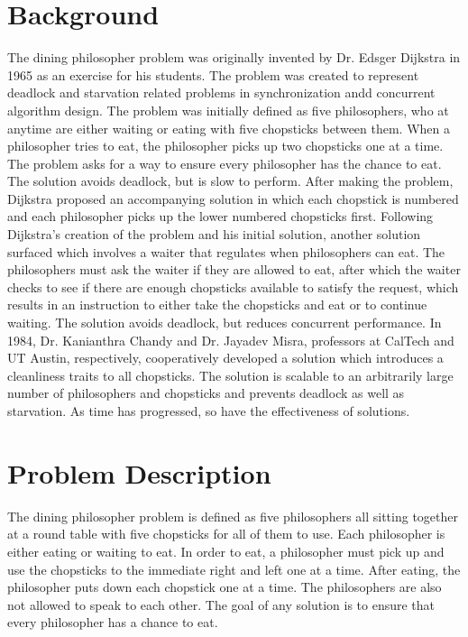 \documentclass{article}
\begin{document}
\section{Background} The dining philosopher problem was originally invented by Dr. Edsger Dijkstra in 1965 as an exercise for his students. The problem was created to represent deadlock and starvation related problems in synchronization andd concurrent algorithm design. The problem was initially defined as five philosophers, who at anytime are either waiting or eating with five chopsticks between them. When a philosopher tries to eat, the philosopher picks up two chopsticks one at a time. The problem asks for a way to ensure every philosopher has the chance to eat. The solution avoids deadlock, but is slow to perform. After making the problem, Dijkstra proposed an accompanying solution in which each chopstick is numbered and each philosopher picks up the lower numbered chopsticks first. Following Dijkstra's creation of the problem and his initial solution, another solution surfaced which involves a waiter that regulates when philosophers can eat. The philosophers must ask the waiter if they are allowed to eat, after which the waiter checks to see if there are enough chopsticks available to satisfy the request, which results in an instruction to either take the chopsticks and eat or to continue waiting. The solution avoids deadlock, but reduces concurrent performance. In 1984, Dr. Kanianthra Chandy and Dr. Jayadev Misra, professors at CalTech and UT Austin, respectively, cooperatively developed a solution which introduces a cleanliness traits to all chopsticks. The solution is scalable to an arbitrarily large number of philosophers and chopsticks and prevents deadlock as well as starvation. As time has progressed, so have the effectiveness of solutions.

\section{Problem Description} The dining philosopher problem is defined as five philosophers all sitting together at a round table with five chopsticks for all of them to use. Each philosopher is either eating or waiting to eat. In order to eat, a philosopher must pick up and use the chopsticks to the immediate right and left one at a time. After eating, the philosopher puts down each chopstick one at a time. The philosophers are also not allowed to speak to each other. The goal of any solution is to ensure that every philosopher has a chance to eat.
\end{document}
